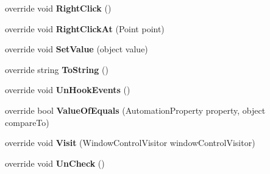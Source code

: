 \begin{DoxyCompactItemize}
\item 
\hypertarget{class_proto_test_1_1_golem_1_1_white_1_1_elements_1_1_white_list_item_a800125e2d41ccbe367b4d84ad3bb5153}{override void {\bfseries Right\-Click} ()}\label{class_proto_test_1_1_golem_1_1_white_1_1_elements_1_1_white_list_item_a800125e2d41ccbe367b4d84ad3bb5153}

\item 
\hypertarget{class_proto_test_1_1_golem_1_1_white_1_1_elements_1_1_white_list_item_af41befc9910b41e05030df1a5528507f}{override void {\bfseries Right\-Click\-At} (Point point)}\label{class_proto_test_1_1_golem_1_1_white_1_1_elements_1_1_white_list_item_af41befc9910b41e05030df1a5528507f}

\item 
\hypertarget{class_proto_test_1_1_golem_1_1_white_1_1_elements_1_1_white_list_item_ad4ed7ddb6a88cba2409a25baf73c0408}{override void {\bfseries Set\-Value} (object value)}\label{class_proto_test_1_1_golem_1_1_white_1_1_elements_1_1_white_list_item_ad4ed7ddb6a88cba2409a25baf73c0408}

\item 
\hypertarget{class_proto_test_1_1_golem_1_1_white_1_1_elements_1_1_white_list_item_a71a451b4800691f89eeedee181a4227f}{override string {\bfseries To\-String} ()}\label{class_proto_test_1_1_golem_1_1_white_1_1_elements_1_1_white_list_item_a71a451b4800691f89eeedee181a4227f}

\item 
\hypertarget{class_proto_test_1_1_golem_1_1_white_1_1_elements_1_1_white_list_item_a94ece082f267bbf91f8eb5d5b900b18b}{override void {\bfseries Un\-Hook\-Events} ()}\label{class_proto_test_1_1_golem_1_1_white_1_1_elements_1_1_white_list_item_a94ece082f267bbf91f8eb5d5b900b18b}

\item 
\hypertarget{class_proto_test_1_1_golem_1_1_white_1_1_elements_1_1_white_list_item_ac546a4119246e2009aad2f1c044b8695}{override bool {\bfseries Value\-Of\-Equals} (Automation\-Property property, object compare\-To)}\label{class_proto_test_1_1_golem_1_1_white_1_1_elements_1_1_white_list_item_ac546a4119246e2009aad2f1c044b8695}

\item 
\hypertarget{class_proto_test_1_1_golem_1_1_white_1_1_elements_1_1_white_list_item_a6f598d73563f088b3493ab8c7addeb6e}{override void {\bfseries Visit} (Window\-Control\-Visitor window\-Control\-Visitor)}\label{class_proto_test_1_1_golem_1_1_white_1_1_elements_1_1_white_list_item_a6f598d73563f088b3493ab8c7addeb6e}

\item 
\hypertarget{class_proto_test_1_1_golem_1_1_white_1_1_elements_1_1_white_list_item_ab86eec60930505f221945c3f3ea6793e}{override void {\bfseries Un\-Check} ()}\label{class_proto_test_1_1_golem_1_1_white_1_1_elements_1_1_white_list_item_ab86eec60930505f221945c3f3ea6793e}

\end{DoxyCompactItemize}
